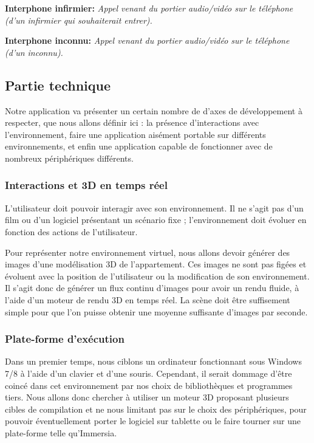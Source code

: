 \textbf{Interphone infirmier: } \textit{Appel venant du portier audio/vidéo sur le téléphone (d'un infirmier qui souhaiterait entrer). }

\textbf{Interphone inconnu: } \textit{Appel venant du portier audio/vidéo sur le téléphone (d'un inconnu). }

\subsection{Partie technique}

Notre application va présenter un certain nombre de d'axes de développement à respecter, que nous allons définir ici : la présence d'interactions avec l'environnement, faire une application aisément portable sur différents environnements, et enfin une application capable de fonctionner avec de nombreux périphériques différents. 

\subsubsection{Interactions et 3D en temps réel}
L'utilisateur doit pouvoir interagir avec son environnement. Il ne s'agit pas d'un film ou d'un logiciel présentant un scénario fixe ; l'environnement doit évoluer en fonction des actions de l'utilisateur.

Pour représenter notre environnement virtuel, nous allons devoir générer des images d'une modélisation 3D de l'appartement. Ces images ne sont pas figées et évoluent avec la position de l'utilisateur ou la modification de son environnement. Il s'agit donc de générer un flux continu d'images pour avoir un rendu fluide, à l'aide d'un moteur de rendu 3D en temps réel. La scène doit être suffisement simple pour que l'on puisse obtenir une moyenne suffisante d'images par seconde.

\subsubsection{Plate-forme d'exécution}

Dans un premier temps, nous ciblons un ordinateur fonctionnant sous Windows 7/8 à l'aide d'un clavier et d'une souris. Cependant, il serait dommage d'être coincé dans cet environnement par nos choix de bibliothèques et programmes tiers. Nous allons donc chercher à utiliser un moteur 3D proposant plusieurs cibles de compilation et ne nous limitant pas sur le choix des périphériques, pour pouvoir éventuellement porter le logiciel sur tablette ou le faire tourner sur une plate-forme telle qu'Immersia.

